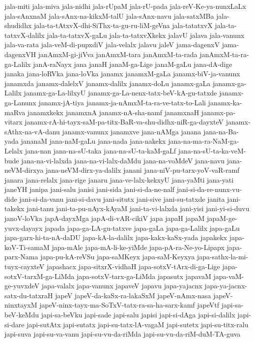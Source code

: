 {jala-miti
jala-miva
jala-nidhi
jala-rUpaM
jala-rU-pada
jala-reV-Ke-ya-nunxLaLx
jala-sAnxnaM
jala-sAnx-na-kikxM-talU
jala-sAnx-navu
jala-satxMBa
jala-shudidhx
jala-ta-tAtxvX-dhi-SiThx-ta-gu-ru-liM-geVna
jala-tatatxvX
jala-ta-tatxvX-dalilx
jala-ta-tatxvX-gaLu
jala-ta-tatxvXkekx
jalavU
jalava
jala-vanunx
jala-va-rata
jala-veM-di-pupxdiV
jala-velalx
jalavu
jaleV
jama-dagenxV
jama-dagenxVH
janAmxM-gi-jiVva
janAmxM-tara
janAmxM-ta-rada
janAmxM-ta-ra-ga-Lalilx
janA-raNayx
jana
janaH
janaM-ga-Lige
janaM-gaLu
jana-dA-dige
janaka
jana-loRVka
jana-loVka
janamx
janamxM-gaLa
janamx-biV-ja-vanunx
janamxda
janamx-dalelxV
janamx-dalilx
janamx-doLu
janamx-gaLa
janamx-ga-Lalilx
janamx-ga-La-lilxyU
janamx-ga-La-nenx-tatx-beV-kA-gu-tatxde
janamx-ga-Lanunx
janamx-jA-tiya
janamx-ja-nAmxM-ta-ra-ve-tatx-to-Lali
janamx-ka-maRva
janamxkekx
janamxnA
janamx-nA-sha-namf
janamxnaH
janamx-pa-vitarx
janamx-rA-hi-tayx-saM-pa-titx-BaR-va-shu-didhx-niR-ga-dayxteV
janamx-sAthx-na-vA-danu
janamx-vanunx
janamxve
jana-nAMga
janana
jana-na-Ba-yada
jananaM
jana-naM-gaLu
jana-nada
jana-nakekx
jana-na-ma-ra-NaM-ga-Lelalx
jana-nan
jana-na-sU-taka
jana-na-sU-ta-kaM-gaLf
jana-na-sU-ta-ka-veM-bude
jana-na-vi-lalxda
jana-na-vi-lalx-daMdu
jana-na-voMdeV
jana-navu
jana-neVM-dirxya
jana-neVM-dirx-ya-dalilx
janani
jana-niV-pu-tarx-yoV-vaR-ramf
janara
jana-relalx
jana-rige
janaru
jana-ve-lalx-kekxyU
jana-yaMti
jana-yati
janeYH
janipa
jani-salu
janisi
jani-sida
jani-si-da-ne-nalf
jani-si-da-re-nunx-vu-dide
jani-si-da-vanu
jani-si-davu
jani-situtx
jani-sive
jani-su-tatxde
janita
jani-takekx
jani-tanu
jani-ta-pu-nAyx-kAyaM
jani-ta-vi-lalxda
jani-yisi
jani-yi-si-duvu
janoV-loVka
japA-dayxMga
japA-di-vAR-cikiV
japa
japaH
japaM
japaM-ge-yuvx-dayayx
japada
japa-ga-LA-gu-tatxve
japa-gaLa
japa-ga-Lalilx
japa-gaLu
japa-garx-hi-ta-nA-daDU
japa-kA-la-dalilx
japa-kakx-kaSx-yada
japakekx
japa-koV-Ti-samaM
japa-mAle
japa-mA-li-ke-yiMde
japa-pA-ra-Ne-yo-Lipapx
japa-parx-Nama
japa-pu-kA-reVSu
japa-saMKeyx
japa-saM-Keyxya
japa-sathx-la-mi-tuyx-cayxteV
japashacx
japa-sitxrX-vidhaH
japa-sotxV-tArx-di-ga-Lige
japa-sotxV-tarxM-ga-LiMda
japa-sotxV-tarx-ga-LiMda
japasutx
japavaM
japa-vaM-ge-yuvxdeV
japa-valalx
japa-vanunx
japaveV
japavu
japa-yajacnx
japa-ya-jacnx-satx-du-tatxraH
japeV
japeV-da-kaSx-ra-lakaSxM
japeV-nAmx-nasa
japeV-ninxtayxM
japeV-ninx-tayx-ma-SoTxV-tatx-ra-sa-ha-sarx-kamf
japeVtf
japi-sa-beV-keMdu
japi-sa-beVku
japi-sade
japi-salu
japisi
japi-si-dAga
japi-si-dalilx
japi-si-dare
japi-sutAtx
japi-sutatx
japi-su-tatx-lA-vagaM
japi-sutetx
japi-su-titx-ralu
japi-suva
japi-su-va-vanu
japi-su-vu-da-riMda
japi-su-vu-da-riM-duM-TA-guva
}
